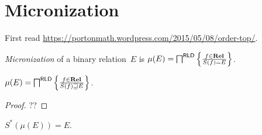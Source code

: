 \chapter{Micronization}

First read \url{https://portonmath.wordpress.com/2015/05/08/order-top/}.

\begin{defn}
\emph{Micronization} of a binary relation~$E$ is
$\mu(E) = \bigsqcap^{\mathsf{RLD}} \left\{ \frac{f\in\mathbf{Rel}}{S(f)=E}\right\}$.
\end{defn}

\begin{thm}
$\mu(E) = \bigsqcap^{\mathsf{RLD}} \left\{ \frac{f\in\mathbf{Rel}}{S(f)\sqsupseteq E}\right\}$.
\end{thm}

\begin{proof}
??
\end{proof}

\begin{conjecture}
$S^{\ast}(\mu(E)) = E$.
\end{conjecture}
